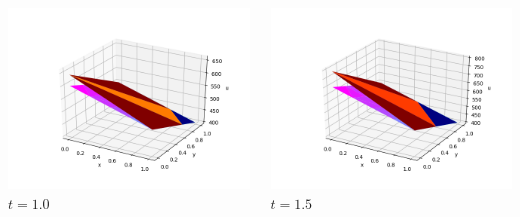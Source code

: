 \documentclass[]{beamer}
\begin{document}
\begin{frame}[t]
\begin{columns}
\begin{center}
			\includegraphics[scale=0.2]{figures/2D_xy_homog1mat_u_vs_x_10}\\
			$t=1.0$
			\end{center}
			\begin{center}
			\includegraphics[scale=0.2]{figures/2D_xy_homog1mat_u_vs_x_15}\\
			\tiny$t=1.5$			
			
			\null
			

\end{center}
\end{columns}
\end{frame}
\end{document}
